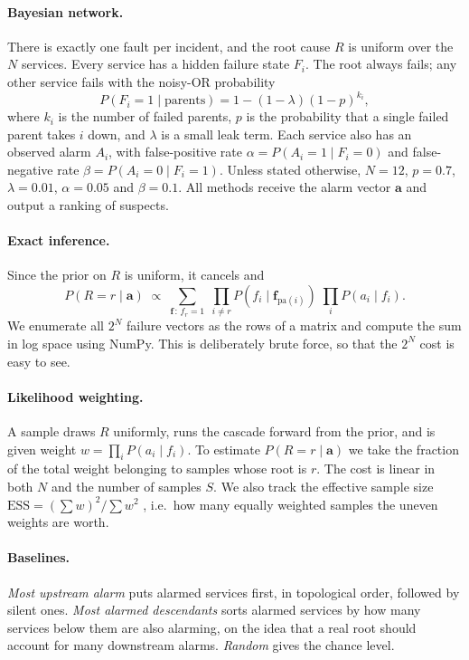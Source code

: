\documentclass{article}
\begin{document}
\paragraph{Bayesian network.}
There is exactly one fault per incident, and the root cause $R$ is uniform over
the $N$ services. Every service has a hidden failure state $F_i$. The root
always fails; any other service fails with the noisy-OR probability
\begin{equation}
  P(F_i = 1 \mid \text{parents}) = 1 - (1-\lambda)(1-p)^{k_i},
\end{equation}
where $k_i$ is the number of failed parents, $p$ is the probability that a
single failed parent takes $i$ down, and $\lambda$ is a small leak term. Each
service also has an observed alarm $A_i$, with false-positive rate
$\alpha = P(A_i = 1 \mid F_i = 0)$ and false-negative rate
$\beta = P(A_i = 0 \mid F_i = 1)$. Unless stated otherwise, $N = 12$,
$p = 0.7$, $\lambda = 0.01$, $\alpha = 0.05$ and $\beta = 0.1$. All methods
receive the alarm vector $\mathbf{a}$ and output a ranking of suspects.

\paragraph{Exact inference.}
Since the prior on $R$ is uniform, it cancels and
\begin{equation}
  P(R = r \mid \mathbf{a}) \;\propto\; \sum_{\mathbf{f}\,:\,f_r = 1}\;
  \prod_{i \neq r} P(f_i \mid \mathbf{f}_{\text{pa}(i)})\;
  \prod_{i} P(a_i \mid f_i).
\end{equation}
We enumerate all $2^N$ failure vectors as the rows of a matrix and compute the
sum in log space using NumPy. This is deliberately brute force, so that the
$2^N$ cost is easy to see.

\paragraph{Likelihood weighting.}
A sample draws $R$ uniformly, runs the cascade forward from the prior, and is
given weight $w = \prod_i P(a_i \mid f_i)$. To estimate
$P(R = r \mid \mathbf{a})$ we take the fraction of the total weight belonging
to samples whose root is $r$. The cost is linear in both $N$ and the number of
samples $S$. We also track the effective sample size
$\text{ESS} = (\sum w)^2 / \sum w^2$ \citep{kong1992note}, i.e.\ how many
equally weighted samples the uneven weights are worth.

\paragraph{Baselines.}
\emph{Most upstream alarm} puts alarmed services first, in topological order,
followed by silent ones. \emph{Most alarmed descendants} sorts alarmed services
by how many services below them are also alarming, on the idea that a real
root should account for many downstream alarms. \emph{Random} gives the chance
level.
\end{document}
